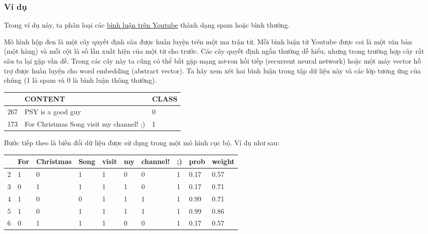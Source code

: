 \subsubsection{Ví dụ}

Trong ví dụ này, ta phân loại các \href{https://christophm.github.io/interpretable-ml-book/spam-data.html#spam-data}{bình luận trên Youtube} thành dạng spam hoặc bình thường.

Mô hình hộp đen là một cây quyết định sâu được huấn luyện trên một ma trận từ. Mỗi bình luận từ Youtube được coi là một văn bản (một hàng) và mỗi cột là số lần xuất hiện của một từ cho trước. Các cây quyết định ngắn thường dễ hiểu, nhưng trong trường hợp cây rất sâu ta lại gặp vấn đề. Trong các cây này ta cũng có thể bắt gặp mạng nơ-ron hồi tiếp (recurrent neural network) hoặc một máy vector hỗ trợ được huấn luyện cho word embedding (abstract vector). Ta hãy xem xét hai bình luận trong tập dữ liệu này và các lớp tương ứng của chúng (1 là spam và 0 là bình luận thông thường).

\begin{table}[hbt!]
\centering
\label{tab:table}
\begin{tabular}{|l|l|l|}
\hline
    & \textbf{CONTENT}                        & \textbf{CLASS} \\ \hline
267 & PSY is a good guy                       & 0              \\ \hline
173 & For Christmas Song visit my channel! ;) & 1              \\ \hline
\end{tabular}
\end{table}

Bước tiếp theo là biến đổi dữ liệu được sử dụng trong một mô hình cục bộ. Ví dụ như sau:

\begin{table}[hbt!]
\centering
\label{tab:my-table}
\begin{tabular}{|l|l|l|l|l|l|l|l|l|l|}
\hline
  & \textbf{For} & \textbf{Christmas} & \textbf{Song} & \textbf{visit} & \textbf{my} & \textbf{channel!} & \textbf{;)} & \textbf{prob} & \textbf{weight} \\ \hline
2 & 1            & 0                  & 1             & 1              & 0           & 0                 & 1           & 0.17          & 0.57            \\ \hline
3 & 0            & 1                  & 1             & 1              & 1           & 0                 & 1           & 0.17          & 0.71            \\ \hline
4 & 1            & 0                  & 0             & 1              & 1           & 1                 & 1           & 0.99          & 0.71            \\ \hline
5 & 1            & 0                  & 1             & 1              & 1           & 1                 & 1           & 0.99          & 0.86            \\ \hline
6 & 0            & 1                  & 1             & 1              & 0           & 0                 & 1           & 0.17          & 0.57            \\ \hline
\end{tabular}
\end{table}

